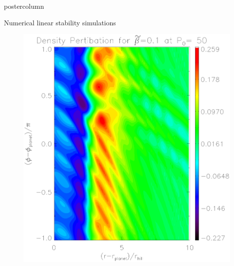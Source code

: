 \documentclass[final,hyperref={pdfpagelabels=false}]{beamer}
\begin{document}
\begin{frame}
\begin{columns}
\begin{column}{.49\textwidth}
\begin{beamercolorbox}[center,wd=\textwidth]{postercolumn}
\begin{minipage}[T]{.95\textwidth}
{\begin{block}{{\Large Numerical linear stability simulations}}
                    \hfill
                    \begin{minipage}[t]{0.49\textwidth}
                      \begin{figure}
                        \centering
                        \includegraphics[width=.95\textwidth,clip=false,trim=0.01cm
                          0cm .1cm 0cm]{Posterfig_lowb}
                      \end{figure}
                    \end{minipage}
                    \begin{minipage}[t]{0.49\textwidth}
                      \begin{figure}

\end{figure}
\end{minipage}
\end{block}}
\end{minipage}
\end{beamercolorbox}
\end{column}
\end{columns}
\end{frame}
\end{document}
